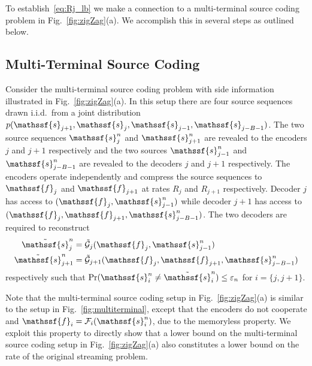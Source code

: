 \documentclass[journal, twocolumn, 10pt]{IEEEtran}
\newcommand{\cF}{{\mathcal{F}}}
\newcommand{\cG}{{\mathcal{G}}}
\newcommand{\eps}{\varepsilon}
\newcommand{\rvf}{{\mathssf{f}}}    %
\newcommand{\rvs}{{\mathssf{s}}}    %
\begin{document}
To establish~\eqref{eq:Rj_lb} we make a connection to a multi-terminal source coding problem in Fig.~\ref{fig:zigZag}(a). We accomplish this in several steps as outlined below.

\subsection{Multi-Terminal Source Coding}
Consider the multi-terminal source coding problem with side information illustrated in Fig.~\ref{fig:zigZag}(a). 
In this setup there are four source sequences drawn i.i.d.\ from a joint distribution $p(\rvs_{j+1},\rvs_j, \rvs_{j-1},\rvs_{j-B-1})$. The two source sequences $\rvs_j^n$ and $\rvs_{j+1}^n$ are revealed to the encoders $j$  and $j+1$ respectively and the two sources
$\rvs_{j-1}^n$ and $\rvs_{j-B-1}^n$ are revealed to the decoders $j$ and $j+1$ respectively. The encoders operate independently and compress the source sequences to $\rvf_j$ and $\rvf_{j+1}$ at rates $R_j$
and $R_{j+1}$ respectively. Decoder $j$ has access to $(\rvf_j, \rvs_{j-1}^n)$ while decoder ${j+1}$ has access to $(\rvf_j, \rvf_{j+1}, \rvs_{j-B-1}^n)$. The two decoders are required to reconstruct
\begin{align}
\tilde{\rvs}_j^n &= \tilde{\cG}_j(\rvf_j, \rvs_{j-1}^n) \label{eq:decoder0a}\\
\tilde{\rvs}_{j+1}^n&=\tilde{\cG}_{j+1}(\rvf_j, \rvf_{j+1}, \rvs_{j-B-1}^n)\label{eq:decoder1a}\end{align} respectively such that $\Pr(\rvs_i^n \neq \tilde{\rvs}_i^n) \le \eps_n$ for ${i=\{ j, j+1\}}$.


Note that the multi-terminal source coding setup in Fig.~\ref{fig:zigZag}(a) is similar to the setup in Fig.~\ref{fig:multiterminal}, except that the encoders do not cooperate and $\rvf_{i} =  \cF_{i}(\rvs^n_{i})$, due to the memoryless property. We exploit this property to directly show that a lower bound on the multi-terminal source coding setup in Fig.~\ref{fig:zigZag}(a) also constitutes a lower bound on the rate of the original streaming problem.
\end{document}
